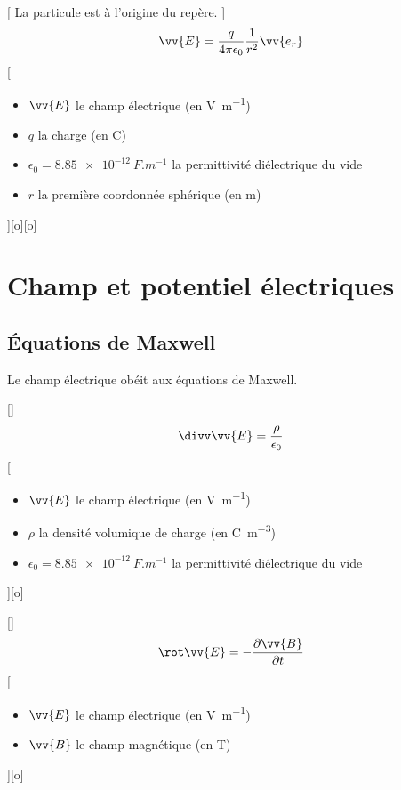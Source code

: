 [
    La particule est à l'origine du repère.
]
{$$\vv{E}=\frac{q}{4\pi\epsilon_0}\frac{1}{r^2}\vv{e_r}$$}
[
    \begin{itemize}
        \item $\vv{E}$ le champ électrique (en \unit{V.m^{-1}})
        \item $q$ la charge (en \unit{C})
        \item $\epsilon_0=\SI{8.85e-12}{F.m^{-1}}$ la permittivité diélectrique du vide
        \item $r$ la première coordonnée sphérique (en \unit{m})
    \end{itemize}
][o][o]


\section{Champ et potentiel électriques}

\subsection{Équations de Maxwell}

Le champ électrique obéit aux équations de Maxwell.

[]
{$$\divv \vv{E}=\frac{\rho}{\epsilon_0}$$}
[
    \begin{itemize}
        \item $\vv{E}$ le champ électrique (en \unit{V.m^{-1}})
        \item $\rho$ la densité volumique de charge (en \unit{C.m^{-3}})
        \item $\epsilon_0=\SI{8.85e-12}{F.m^{-1}}$ la permittivité diélectrique du vide
    \end{itemize}
][o]


[]
{$$\rot\vv{E}=-\frac{\partial\vv{B}}{\partial t}$$}
[
    \begin{itemize}
        \item $\vv{E}$ le champ électrique (en \unit{V.m^{-1}})
        \item $\vv{B}$ le champ magnétique (en \unit{T})
    \end{itemize}
][o]

